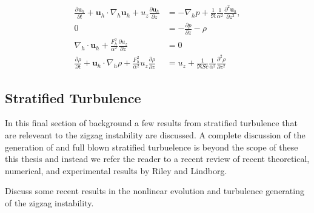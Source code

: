 \begin{align}
\frac{\partial \textbf{u}_{h}}{\partial t} + \textbf{u}_{h}\cdot\nabla_{h}\textbf{u}_{h}+u_{z}\frac{\partial \textbf{u}_{h}}{\partial z} &= -\nabla_{h}p + \frac{1}{\Re}\frac{1}{\alpha^{2}}\frac{\partial^{2}\textbf{u}_{h}}{\partial z^{2}},\\
0&= -\frac{\partial p}{\partial z} - \rho  \\
\nabla_{h}\cdot\textbf{u}_{h}+ \frac{F_{h}^{2}}{\alpha^{2}}\frac{\partial u_{z}}{\partial z} &=0\\
\frac{\partial \rho}{\partial t} + \textbf{u}_{h}\cdot\nabla_{h}\rho + \frac{F_{h}^{2}}{\alpha^{2}}u_{z}\frac{\partial \rho}{\partial z} &= u_{z} + \frac{1}{\Re Sc}\frac{1}{\alpha^{2}}\frac{\partial^{2}\rho}{\partial z^{2}} 
\end{align} 
\subsection{Stratified Turbulence} 
In this final section of background a few results from stratified turbulence that are releveant to the zigzag instability are discussed. A complete discussion of the generation of and full blown stratified turbuelence is beyond the scope of these this thesis and instead we refer the reader to a recent review of recent theoretical, numerical, and experimental results by Riley and Lindborg. 

Discuss some recent results in the nonlinear evolution and turbulence generating of the zigzag instability.



